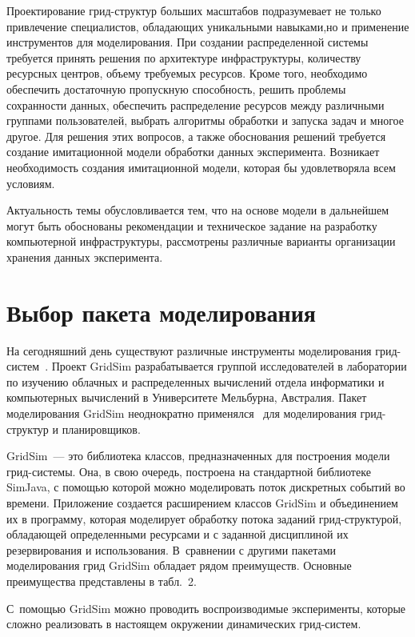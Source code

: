 \begin{multicols}{2}
   Проектирование грид-структур больших мас\-шта\-бов подразумевает не только 
привлечение специалистов, обладающих уникальными навыками,\linebreak но и 
применение инструментов для {моделирования}. При создании распределенной 
системы требуется принять решения по архитектуре инфраструктуры, 
количеству ресурсных центров, объему \mbox{требуемых} ресурсов. Кроме того, 
необходимо обеспечить достаточную пропускную способность, решить 
проблемы сохранности данных, обеспечить распределение ресурсов между 
различными группами пользователей, выбрать алгоритмы обработки и запуска 
задач и многое другое. Для решения этих вопросов, а также обоснования 
решений требуется создание имитационной модели обработки данных 
эксперимента. Возникает необходимость создания имитационной модели, 
которая бы удовлетворяла всем условиям. 
   
   Актуальность темы обусловливается тем, что на основе модели в дальнейшем 
могут быть обоснованы рекомендации и техническое задание на разработку 
компьютерной инфраструктуры, рас\-смот\-ре\-ны различные варианты 
организации хранения данных эксперимента. 

\section{Выбор пакета моделирования}

   На сегодняшний день существуют различные инструменты моделирования 
грид-сис\-тем~\cite{5-kor}. Проект GridSim разрабатывается группой 
исследователей в лаборатории по изучению облачных и распределенных 
вычислений отдела информатики и компьютерных вычислений в Университете 
Мельбурна, Австралия. Пакет моделирования GridSim неоднократно 
применялся~\cite{6-kor} для моделирования грид-струк\-тур и планировщиков.
   
   GridSim~--- это библиотека классов, предназначенных для построения 
модели грид-системы. Она, в свою очередь, построена на стандартной 
библиотеке SimJava, с помощью которой можно моделировать поток 
дискретных событий во времени. Приложение создается расширением классов 
GridSim и объединением их в программу, которая моделирует обработку потока 
заданий грид-струк\-ту\-рой, обладающей определенными ресурсами и с 
заданной дисциплиной их резервирования и использования. В~сравнении с 
другими пакетами моделирования грид GridSim обладает рядом преимуществ. 
Основные преимущества представлены в табл.~2. 

С~по\-мощью GridSim можно 
проводить воспроизводимые эксперименты, которые сложно реализовать в 
настоящем окружении динамических грид-сис\-тем.
   



\end{multicols}
